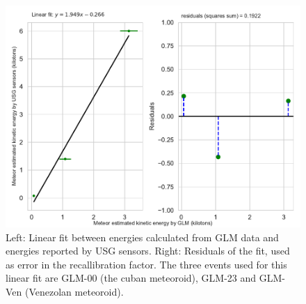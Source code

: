 \begin{figure}
  \centering
  \includegraphics[width=\linewidth]{../energy_fit}
  \caption{Left: Linear fit between energies calculated from GLM data and energies reported by USG sensors. Right: Residuals of the fit, used as error in the recallibration factor. The three events used for this linear fit are GLM-00 (the cuban meteoroid), GLM-23 and GLM-Ven (Venezolan meteoroid).}
  \label{fig:lin_fit}
\end{figure}


